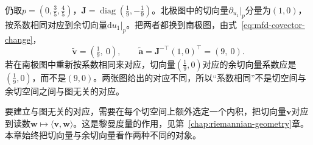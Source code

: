 仍取$p=(0,\tfrac35,\tfrac45)$，$\bm J=\operatorname{diag}(\tfrac19,-\tfrac19)$。北极图中的切向量$\partial_{u_1}|_p$分量为$(1,0)$，按系数相同对应到余切向量$\mathrm du_1|_p$。把两者都换到南极图，由式~\eqref{eq:mfd-covector-change}，
\[
\tilde{\bm v}=(\tfrac19,\ 0),\qquad
\tilde{\bm a}=\bm J^{-\top}(1,0)^\top=(9,\ 0).
\]
若在南极图中重新按系数相同来对应，切向量$(\tfrac19,0)$对应的余切向量系数应是$(\tfrac19,0)$，而不是$(9,0)$。两张图给出的对应不同，所以“系数相同”不是切空间与余切空间之间与图无关的对应。

要建立与图无关的对应，需要在每个切空间上额外选定一个内积，把切向量$\bm v$对应到读数$\bm w\mapsto\langle\bm v,\bm w\rangle$。这是黎曼度量的作用，见第~\ref{chap:riemannian-geometry}章。本章始终把切向量与余切向量看作两种不同的对象。
